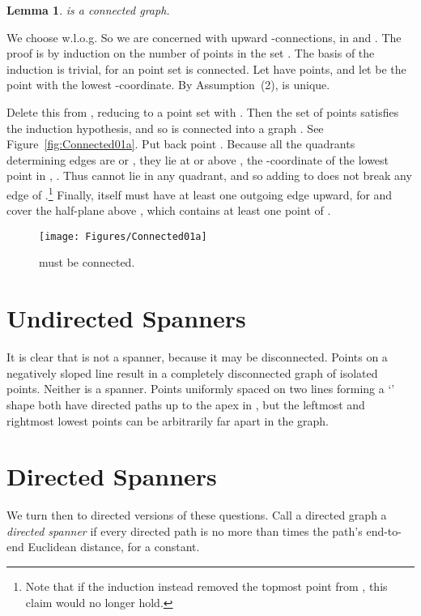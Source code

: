 \pdfoutput=1  \documentclass[]{article}
\newcommand{\ABox}{
\raisebox{3pt}{\framebox[6pt]{\rule{6pt}{0pt}}}
}
\newenvironment{proof}{{\bf Proof:}}{\hfill\ABox}
\newtheorem{lemma}[theorem]{Lemma}
\newcommand{\figlab}[1]{\label{fig:#1}}
\newcommand{\figref}[1]{\ref{fig:#1}}
\begin{document}
\begin{lemma}
 is a connected graph.
\end{lemma}
\begin{proof}
We choose  w.l.o.g.
So we are concerned with upward -connections, in  and .
The proof is by induction on the number of points  in the set .
The basis of the induction is trivial, for an  point set is connected.
Let  have  points, and let  be the point with the lowest
-coordinate.  
By Assumption~(2),  is unique.  

Delete this from , reducing to a point set  with .  
Then the set of points 
satisfies the induction hypothesis, and so is connected into a graph . 
See Figure~\figref{Connected01a}.
Put back point .
Because all the quadrants determining edges  are  or , they lie at or above , the -coordinate of the lowest point
in ,
.
Thus  cannot lie in any quadrant, and so adding  to  does not break any edge
of .\footnote{
    Note that if the induction instead removed the topmost point from , this claim
    would no longer hold.}
Finally,  itself must have at least one outgoing edge upward, for  and  cover
the half-plane above , which contains at least one point of .
\end{proof}



\begin{figure}[htbp]
\centering
\texttt{[image: Figures/Connected01a]}
\caption{ must be connected.}
\figlab{Connected{01}a}
\end{figure}


\section{Undirected Spanners}
It is clear that  is not a spanner, because it may be
disconnected.  Points on a negatively sloped line result in a completely
disconnected graph of isolated points.
Neither is  a spanner.  Points uniformly spaced on two lines forming a `' shape
both have directed paths up to the apex in , 
but the leftmost and rightmost lowest
points can be arbitrarily far apart in the graph.

\section{Directed Spanners}
We turn then to directed versions of these questions.
Call a directed graph a \emph{directed spanner} if every directed path
is no more than  times the path's end-to-end Euclidean distance,
for  a constant.
\end{document}
